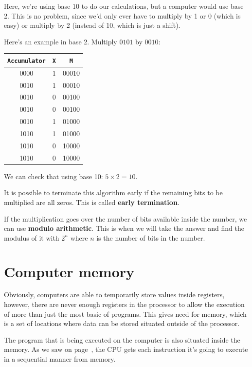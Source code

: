 Here, we're using base 10 to do our calculations, but a computer would use base
2. This is no problem, since we'd only ever have to multiply by 1 or 0 (which is
easy) or multiply by 2 (instead of 10, which is just a shift).

Here's an example in base 2. Multiply $0101$ by $0010$:

\begin{center}
	\begin{tabular}{c c c}
		{\tt Accumulator} & {\tt X} & {\tt M}\\ \hline
		0000 & 1 & 00010\\
		0010 & 1 & 00010\\
		0010 & 0 & 00100\\
		0010 & 0 & 00100\\
		0010 & 1 & 01000\\
		1010 & 1 & 01000\\
		1010 & 0 & 10000\\
		1010 & 0 & 10000\\
	\end{tabular}
\end{center}

We can check that using base 10: $5 \times 2 = 10$.

It is possible to terminate this algorithm early if the remaining bits to be
multiplied are all zeros. This is called {\bf early termination}.

If the multiplication goes over the number of bits available inside the number,
we can use {\bf modulo arithmetic}. This is when we will take the answer and
find the modulus of it with $2^n$ where $n$ is the number of bits in the number.


\section{Computer memory}

Obviously, computers are able to temporarily store values inside registers,
however, there are never enough registers in the processor to allow the
execution of more than just the most basic of programs. This gives need for
memory, which is a set of locations where data can be stored situated outside of
the processor.

The program that is being executed on the computer is also situated inside the
memory. As we saw on page~\pageref{subsubsec:fetch_decode_execute}, the CPU gets
each instruction it's going to execute in a sequential manner from memory.

